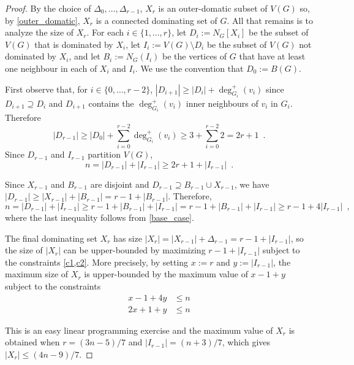 \documentclass[12pt]{article}
\begin{document}
\begin{proof}
By the choice of $\Delta_0,\ldots,\Delta_{r-1}$, $X_r$ is an outer-domatic subset of $V(G)$ so, by \cref{outer_domatic}, $X_r$ is a connected dominating set of $G$.  All that remains is to analyze the size of $X_r$.  For each $i\in\{1,\ldots,r\}$, let $D_i:=N_G[X_i]$ be the subset of $V(G)$ that is dominated by $X_i$, let $I_i:=V(G)\setminus D_i$ be the subset of $V(G)$ not dominated by $X_i$, and let $B_i:=N_G(I_i)$ be the vertices of $G$ that have at least one neighbour in each of $X_i$ and $I_i$.  We use the convention that $D_0:=B(G)$.

First observe that, for $i\in\{0,\ldots,r-2\}$, $|D_{i+1}|\ge |D_i|+\deg_{G_i}^+(v_i)$ since $D_{i+1}\supseteq D_i$ and $D_{i+1}$ contains the $\deg_{G_i}^+(v_i)$ inner neighbours of $v_i$ in $G_i$.  Therefore
\[
    |D_{r-1}| \ge |D_0| + \sum_{i=0}^{r-2} \deg_{G_i}^+(v_i) \ge 3 + \sum_{i=0}^{r-2} 2 =  2r+1 \enspace . \label{double_d}
\]
Since $D_{r-1}$ and $I_{r-1}$ partition $V(G)$,
\begin{equation}
  n = |D_{r-1}| + |I_{r-1}| \ge 2r+1 + |I_{r-1}|  \enspace . \label{c1}
\end{equation}

Since $X_{r-1}$ and $B_{r-1}$ are disjoint and $D_{r-1}\supseteq B_{r-1}\cup X_{r-1}$, we have $|D_{r-1}|\ge |X_{r-1}| + |B_{r-1}|=r-1+|B_{r-1}|$.  Therefore,
\begin{equation}
    n = |D_{r-1}| + |I_{r-1}| \ge r-1 + |B_{r-1}| + |I_{r-1}| = r-1 + |B_{r-1}| + |I_{r-1}|
    \ge r - 1 + 4|I_{r-1}| \enspace , \label{c2}
\end{equation}
where the last inequality follows from \cref{base_case}.

The final dominating set $X_r$ has size $|X_r| = |X_{r-1}| + \Delta_{r-1} = r - 1 +|I_{r-1}|$, so the size of $|X_r|$ can be upper-bounded by maximizing $r-1+|I_{r-1}|$ subject to the constraints \cref{c1,c2}.  More precisely, by setting $x:=r$ and $y:=|I_{r-1}|$, the maximum size of $X_r$ is upper-bounded by the maximum value of $x-1+y$ subject to the constraints
\begin{align*}
  x - 1 + 4y & \le n \\
  2x + 1 + y & \le n
\end{align*}

This is an easy linear programming exercise and the maximum value of $X_{r}$ is obtained when $r=(3n-5)/7$ and $|I_{r-1}|=(n+3)/7$, which gives
$|X_r| \le (4n-9)/7$.
\end{proof}
\end{document}

